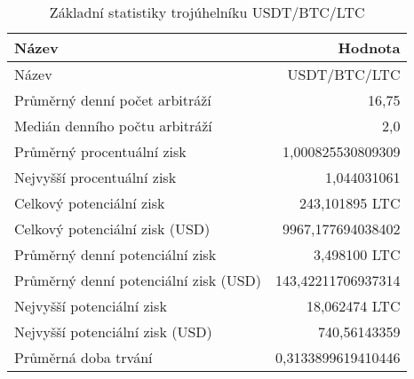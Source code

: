 \begin{table}\centering
\caption{Základní statistiky trojúhelníku USDT/BTC/LTC}
\label{USDTBTCLTC_stats}
\begin{tabular}{|| l | r ||}
\hline Název & Hodnota \\ 
\hline\hline Název & USDT/BTC/LTC \\ 
\hline Průměrný denní počet arbitráží & 16,75 \\ 
\hline Medián denního počtu arbitráží & 2,0 \\ 
\hline Průměrný procentuální zisk & 1,000825530809309 \\ 
\hline Nejvyšší procentuální zisk & 1,044031061 \\ 
\hline Celkový potenciální zisk & 243,101895 LTC \\ 
\hline Celkový potenciální zisk (USD) & 9967,177694038402 \\ 
\hline Průměrný denní potenciální zisk & 3,498100 LTC \\ 
\hline Průměrný denní potenciální zisk (USD) & 143,42211706937314 \\ 
\hline Nejvyšší potenciální zisk & 18,062474 LTC \\ 
\hline Nejvyšší potenciální zisk (USD) & 740,56143359 \\ 
\hline Průměrná doba trvání & 0,3133899619410446 \\ 
\hline
\end{tabular}
\end{table}